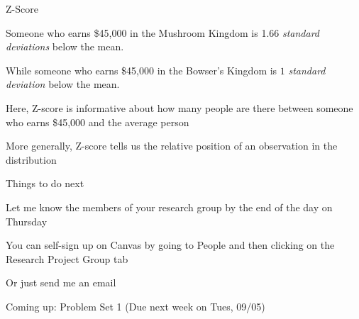 \documentclass{./../div_teaching_slides}
\begin{document}
\begin{frame}{Z-Score}
\begin{witemize}
\item Someone who earns \$45,000 in the Mushroom Kingdom is 1.66 \textit{standard deviations} below the mean.
\item While someone who earns \$45,000 in the  Bowser's Kingdom is $1$ \textit{standard deviation} below the mean.
  \item Here, Z-score is informative about how many people are there between someone who earns \$45,000 and the average person 
  \item More generally, Z-score tells us the relative position of an observation in the distribution
\end{witemize}
\end{frame}

\begin{frame}{Things to do next}
\begin{witemize}
\item Let me know the members of your research group by the end of the day on Thursday
\vspace{0.5em}
\begin{witemize}
\normalsize
\item You can self-sign up on Canvas by going to People and then clicking on the Research Project Group tab
\item Or just send me an email
\end{witemize}
\item Coming up: Problem Set 1 (Due next week on Tues, 09/05)
\end{witemize}
\end{frame}
\end{document}
